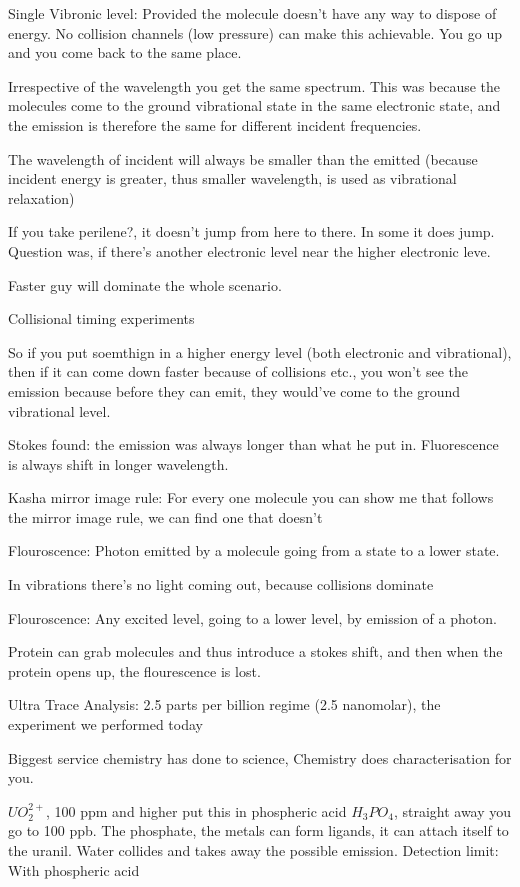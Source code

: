 	Single Vibronic level: Provided the molecule doesn't have any way to dispose of energy. No collision channels (low pressure) can make this achievable. You go up and you come back to the same place. 

	Irrespective of the wavelength you get the same spectrum. This was because the molecules come to the ground vibrational state in the same electronic state, and the emission is therefore the same for different incident frequencies.

	The wavelength of incident will always be smaller than the emitted (because incident energy is greater, thus smaller wavelength, is used as vibrational relaxation)

	If you take perilene?, it doesn't jump from here to there. In some it does jump. Question was, if there's another electronic level near the higher electronic leve.

	Faster guy will dominate the whole scenario. 

	Collisional timing experiments

	So if you put soemthign in a higher energy level (both electronic and vibrational), then if it can come down faster because of collisions etc., you won't see the emission because before they can emit, they would've come to the ground vibrational level.	

	Stokes found: the emission was always longer than what he put in. Fluorescence is always shift in longer wavelength.

	Kasha mirror image rule: For every one molecule you can show me that follows the mirror image rule, we can find one that doesn't

	Flouroscence: Photon emitted by a molecule going from a state to a lower state.


	In vibrations there's no light coming out, because collisions dominate

	Flouroscence: Any excited level, going to a lower level, by emission of a photon.

	Protein can grab molecules and thus introduce a stokes shift, and then when the protein opens up, the flourescence is lost.

	Ultra Trace Analysis: 2.5 parts per billion regime (2.5 nanomolar), the experiment we performed today

	Biggest service chemistry has done to science, Chemistry does characterisation for you. 

	$UO_2^{2+}$, 100 ppm and higher
	put this in phospheric acid $H_3PO_4$, straight away you go to 100 ppb. The phosphate, the metals can form ligands, it can attach itself to the uranil. Water collides and takes away the possible emission.
	Detection limit:
	With phospheric acid 

